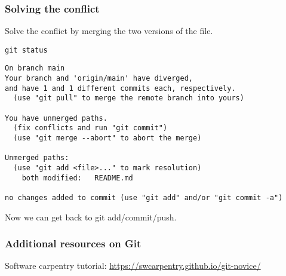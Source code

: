 \documentclass{beamer}
\begin{document}
	\begin{frame}[fragile]
		\frametitle{Solving the conflict}
		
		Solve the conflict by merging the two versions of the file.

		\begin{exampleblock}{}
		\begin{BVerbatim}
git status
		\end{BVerbatim}
		\end{exampleblock}{}

		\begin{exampleblock}{}
		\begin{tiny}
		\begin{BVerbatim}
On branch main
Your branch and 'origin/main' have diverged,
and have 1 and 1 different commits each, respectively.
  (use "git pull" to merge the remote branch into yours)

You have unmerged paths.
  (fix conflicts and run "git commit")
  (use "git merge --abort" to abort the merge)

Unmerged paths:
  (use "git add <file>..." to mark resolution)
	both modified:   README.md

no changes added to commit (use "git add" and/or "git commit -a")
		\end{BVerbatim}
		\end{tiny}
		\end{exampleblock}{}		

		Now we can get back to git add/commit/push.
	\end{frame}

	\begin{frame}
		\frametitle{Additional resources on Git}

		Software carpentry tutorial: \href{https://swcarpentry.github.io/git-novice/}{https://swcarpentry.github.io/git-novice/}
	\end{frame}
\end{document}
